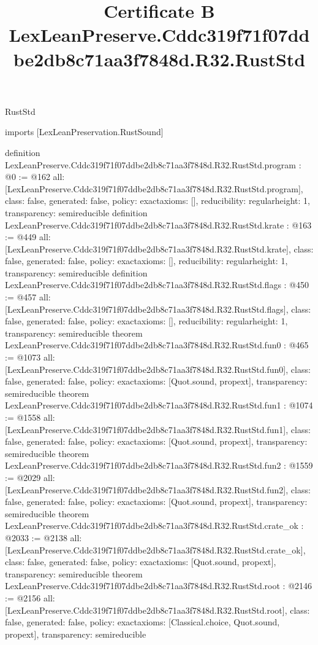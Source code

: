 \begin{lexlean}{RustStd}
\title{Certificate B LexLeanPreserve.Cddc319f71f07ddbe2db8c71aa3f7848d.R32.RustStd}
\begin{coremodule}
imports [LexLeanPreservation.RustSound]

definition LexLeanPreserve.Cddc319f71f07ddbe2db8c71aa3f7848d.R32.RustStd.program : @0 := @162 {
  all: [LexLeanPreserve.Cddc319f71f07ddbe2db8c71aa3f7848d.R32.RustStd.program],
  class: false,
  generated: false,
  policy: exact{axioms: []},
  reducibility: regular{height: 1},
  transparency: semireducible
}
definition LexLeanPreserve.Cddc319f71f07ddbe2db8c71aa3f7848d.R32.RustStd.krate : @163 := @449 {
  all: [LexLeanPreserve.Cddc319f71f07ddbe2db8c71aa3f7848d.R32.RustStd.krate],
  class: false,
  generated: false,
  policy: exact{axioms: []},
  reducibility: regular{height: 1},
  transparency: semireducible
}
definition LexLeanPreserve.Cddc319f71f07ddbe2db8c71aa3f7848d.R32.RustStd.flags : @450 := @457 {
  all: [LexLeanPreserve.Cddc319f71f07ddbe2db8c71aa3f7848d.R32.RustStd.flags],
  class: false,
  generated: false,
  policy: exact{axioms: []},
  reducibility: regular{height: 1},
  transparency: semireducible
}
theorem LexLeanPreserve.Cddc319f71f07ddbe2db8c71aa3f7848d.R32.RustStd.fun0 : @465 := @1073 {
  all: [LexLeanPreserve.Cddc319f71f07ddbe2db8c71aa3f7848d.R32.RustStd.fun0],
  class: false,
  generated: false,
  policy: exact{axioms: [Quot.sound, propext]},
  transparency: semireducible
}
theorem LexLeanPreserve.Cddc319f71f07ddbe2db8c71aa3f7848d.R32.RustStd.fun1 : @1074 := @1558 {
  all: [LexLeanPreserve.Cddc319f71f07ddbe2db8c71aa3f7848d.R32.RustStd.fun1],
  class: false,
  generated: false,
  policy: exact{axioms: [Quot.sound, propext]},
  transparency: semireducible
}
theorem LexLeanPreserve.Cddc319f71f07ddbe2db8c71aa3f7848d.R32.RustStd.fun2 : @1559 := @2029 {
  all: [LexLeanPreserve.Cddc319f71f07ddbe2db8c71aa3f7848d.R32.RustStd.fun2],
  class: false,
  generated: false,
  policy: exact{axioms: [Quot.sound, propext]},
  transparency: semireducible
}
theorem LexLeanPreserve.Cddc319f71f07ddbe2db8c71aa3f7848d.R32.RustStd.crate_ok : @2033 := @2138 {
  all: [LexLeanPreserve.Cddc319f71f07ddbe2db8c71aa3f7848d.R32.RustStd.crate_ok],
  class: false,
  generated: false,
  policy: exact{axioms: [Quot.sound, propext]},
  transparency: semireducible
}
theorem LexLeanPreserve.Cddc319f71f07ddbe2db8c71aa3f7848d.R32.RustStd.root : @2146 := @2156 {
  all: [LexLeanPreserve.Cddc319f71f07ddbe2db8c71aa3f7848d.R32.RustStd.root],
  class: false,
  generated: false,
  policy: exact{axioms: [Classical.choice, Quot.sound, propext]},
  transparency: semireducible
}


\end{coremodule}
\end{lexlean}
